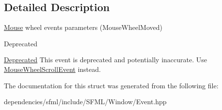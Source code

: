 \subsection{Detailed Description}
\hyperlink{classsf_1_1_mouse}{Mouse} wheel events parameters (Mouse\+Wheel\+Moved) 

\begin{DoxyRefDesc}{Deprecated}
\item[\hyperlink{deprecated__deprecated000017}{Deprecated}]This event is deprecated and potentially inaccurate. Use \hyperlink{structsf_1_1_event_1_1_mouse_wheel_scroll_event}{Mouse\+Wheel\+Scroll\+Event} instead.\end{DoxyRefDesc}


The documentation for this struct was generated from the following file\+:\begin{DoxyCompactItemize}
\item 
dependencies/sfml/include/\+S\+F\+M\+L/\+Window/Event.\+hpp\end{DoxyCompactItemize}
